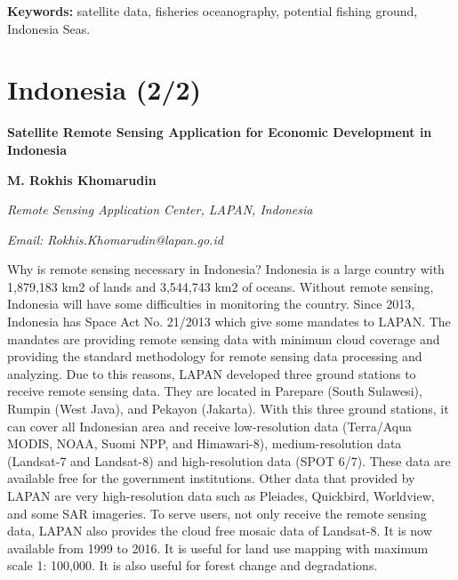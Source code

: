{\begin{center}
\textbf{Keywords:} satellite data, fisheries oceanography, potential fishing ground, Indonesia Seas. \par
\end{center}
}


\section{Indonesia (2/2)}

\vspace{0.5 cm}

{
	\begin{center}
	{\large \bfseries Satellite Remote Sensing Application for Economic Development in Indonesia\par}
	\vspace{0.5 cm}
	{\bfseries M. Rokhis Khomarudin\par}
	{\itshape Remote Sensing Application Center, LAPAN, Indonesia\par}
	{\itshape Email: Rokhis.Khomarudin@lapan.go.id\par}
	\end{center}
	{\tab Why is remote sensing necessary in Indonesia? Indonesia is a large country with 1,879,183 km2 of lands and 3,544,743 km2 of oceans.  Without remote sensing, Indonesia will have some difficulties in monitoring the country. Since 2013, Indonesia has Space Act No. 21/2013 which give some mandates to LAPAN. The mandates are providing remote sensing data with minimum cloud coverage and providing the standard methodology for remote sensing data processing and analyzing.  Due to this reasons, LAPAN developed three ground stations to receive remote sensing data. They are located in Parepare (South Sulawesi), Rumpin (West Java), and Pekayon (Jakarta). With this three ground stations, it can cover all Indonesian area and receive low-resolution data (Terra/Aqua MODIS, NOAA, Suomi NPP, and Himawari-8), medium-resolution data (Landsat-7 and Landsat-8) and high-resolution data (SPOT 6/7). These data are available free for the government institutions. Other data that provided by LAPAN are very high-resolution data such as Pleiades,  Quickbird, Worldview, and some SAR imageries.  To serve users, not only receive the remote sensing data, LAPAN also provides the cloud free mosaic data of Landsat-8. It is now available from 1999 to 2016. It is useful for land use mapping with maximum scale 1: 100,000. It is also useful for forest change and degradations.
	
}}
